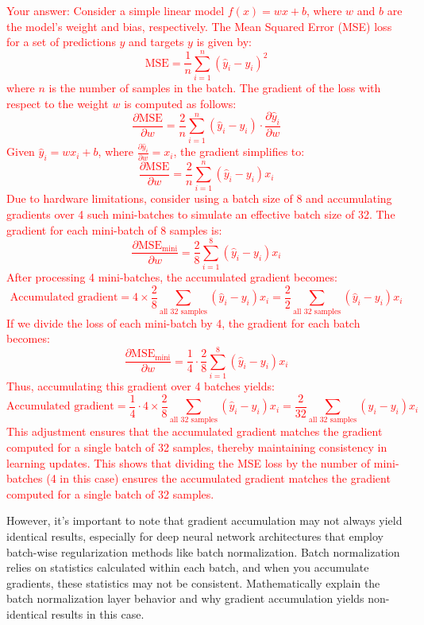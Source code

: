 \textcolor{red}{
Your answer: Consider a simple linear model \( f(x) = wx + b \), where \( w \) and \( b \) are the model's weight and bias, respectively. The Mean Squared Error (MSE) loss for a set of predictions \( \hat{y} \) and targets \( y \) is given by:
\[
\text{MSE} = \frac{1}{n} \sum_{i=1}^n (\hat{y}_i - y_i)^2
\]
where \( n \) is the number of samples in the batch. The gradient of the loss with respect to the weight \( w \) is computed as follows:
\[
\frac{\partial \text{MSE}}{\partial w} = \frac{2}{n} \sum_{i=1}^n (\hat{y}_i - y_i) \cdot \frac{\partial \hat{y}_i}{\partial w}
\]
Given \( \hat{y}_i = wx_i + b \), where \( \frac{\partial \hat{y}_i}{\partial w} = x_i \), the gradient simplifies to:
\[
\frac{\partial \text{MSE}}{\partial w} = \frac{2}{n} \sum_{i=1}^n (\hat{y}_i - y_i) x_i
\]
Due to hardware limitations, consider using a batch size of 8 and accumulating gradients over 4 such mini-batches to simulate an effective batch size of 32. The gradient for each mini-batch of 8 samples is:
\[
\frac{\partial \text{MSE}_{\text{mini}}}{\partial w} = \frac{2}{8} \sum_{i=1}^8 (\hat{y}_i - y_i) x_i
\]
After processing 4 mini-batches, the accumulated gradient becomes:
\[
\text{Accumulated gradient} = 4 \times \frac{2}{8} \sum_{\text{all } 32 \text{ samples}} (\hat{y}_i - y_i) x_i = \frac{2}{2} \sum_{\text{all } 32 \text{ samples}} (\hat{y}_i - y_i) x_i
\]
If we divide the loss of each mini-batch by 4, the gradient for each batch becomes:
\[
\frac{\partial \text{MSE}_{\text{mini}}}{\partial w} = \frac{1}{4} \cdot \frac{2}{8} \sum_{i=1}^8 (\hat{y}_i - y_i) x_i
\]
Thus, accumulating this gradient over 4 batches yields:
\[
\text{Accumulated gradient} = \frac{1}{4} \cdot 4 \times \frac{2}{8} \sum_{\text{all } 32 \text{ samples}} (\hat{y}_i - y_i) x_i = \frac{2}{32} \sum_{\text{all } 32 \text{ samples}} (\hat{y}_i - y_i) x_i
\]
This adjustment ensures that the accumulated gradient matches the gradient computed for a single batch of 32 samples, thereby maintaining consistency in learning updates.
This shows that dividing the MSE loss by the number of mini-batches (4 in this case) ensures the accumulated gradient matches the gradient computed for a single batch of 32 samples.
}

However, it's important to note that gradient accumulation may not always yield identical results, especially for deep neural network architectures that employ batch-wise regularization methods like batch normalization. Batch normalization relies on statistics calculated within each batch, and when you accumulate gradients, these statistics may not be consistent. Mathematically explain the batch normalization layer behavior and why gradient accumulation yields non-identical results in this case.

